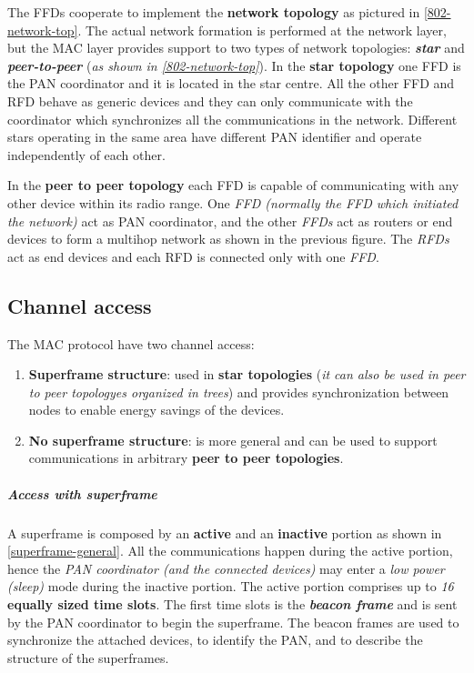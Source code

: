 \documentclass[10pt,a4paper]{report}
\theoremstyle{definition}
\begin{document}
The FFDs cooperate to implement the \textbf{network topology} as pictured in \ref{802-network-top}. The actual network formation is performed at the network layer, but the MAC layer provides support to two types of network topologies: \textit{\textbf{star}} and \textit{\textbf{peer-to-peer}} (\textit{as shown in \ref{802-network-top}}).
In the \textbf{star topology} one FFD is the PAN coordinator and it is located in the star centre.  All the other FFD and RFD behave as generic devices and they can only communicate with the coordinator which synchronizes all the communications in the network.  Different stars operating in the same area have different PAN identifier and operate independently of each other.

In the \textbf{peer to peer topology} each FFD is capable of communicating with any other device within its radio range. One \textit{FFD (normally the FFD which initiated the network)} act as PAN coordinator, and the other \textit{FFDs} act as routers or end devices to form a multihop network as shown in the previous figure. The \textit{RFDs} act as
end devices and each RFD is connected only with one \textit{FFD}.
\subsection{Channel access}\label{sec:channel-access}
The MAC protocol have two channel access:
\begin{enumerate}
	\item 
	\textbf{Superframe structure}: used in \textbf{star topologies} (\textit{it can also be used in peer to peer topologyes organized in trees}) and provides synchronization between nodes to enable energy savings of the devices.
	\item 
	\textbf{No superframe structure}: is more general and can be used to support communications in arbitrary \textbf{peer to peer topologies}.
\end{enumerate}
\subparagraph{Access with superframe}\label{sec:1-access-with-superframe}
A superframe is composed by an \textbf{active} and an \textbf{inactive} portion as shown in \ref{superframe-general}. All the communications happen during the active portion, hence the \textit{PAN coordinator (and the connected devices)} may enter a \textit{low power (sleep)} mode during the inactive portion. The active portion comprises up to \textit{16} \textbf{equally sized time slots}.
The first time slots is the \textit{\textbf{beacon frame}} and is sent by the PAN coordinator to begin the superframe. The beacon frames are used to synchronize the attached devices, to identify the PAN, and to describe the structure of the superframes.
\end{document}
